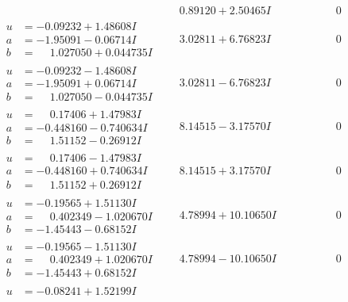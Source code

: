 \documentclass[1p]{elsarticle_modified}
\theoremstyle{definition}
\begin{document}
$$\begin{array}{c|c|c}
 & \phantom{-}0.89120 + 2.50465 I & \phantom{-0.000000 } 0 \\ \hline\begin{aligned}
u &= -0.09232 + 1.48608 I \\
a &= -1.95091 - 0.06714 I \\
b &= \phantom{-}1.027050 + 0.044735 I\end{aligned}
 & \phantom{-}3.02811 + 6.76823 I & \phantom{-0.000000 } 0 \\ \hline\begin{aligned}
u &= -0.09232 - 1.48608 I \\
a &= -1.95091 + 0.06714 I \\
b &= \phantom{-}1.027050 - 0.044735 I\end{aligned}
 & \phantom{-}3.02811 - 6.76823 I & \phantom{-0.000000 } 0 \\ \hline\begin{aligned}
u &= \phantom{-}0.17406 + 1.47983 I \\
a &= -0.448160 - 0.740634 I \\
b &= \phantom{-}1.51152 - 0.26912 I\end{aligned}
 & \phantom{-}8.14515 - 3.17570 I & \phantom{-0.000000 } 0 \\ \hline\begin{aligned}
u &= \phantom{-}0.17406 - 1.47983 I \\
a &= -0.448160 + 0.740634 I \\
b &= \phantom{-}1.51152 + 0.26912 I\end{aligned}
 & \phantom{-}8.14515 + 3.17570 I & \phantom{-0.000000 } 0 \\ \hline\begin{aligned}
u &= -0.19565 + 1.51130 I \\
a &= \phantom{-}0.402349 - 1.020670 I \\
b &= -1.45443 - 0.68152 I\end{aligned}
 & \phantom{-}4.78994 + 10.10650 I & \phantom{-0.000000 } 0 \\ \hline\begin{aligned}
u &= -0.19565 - 1.51130 I \\
a &= \phantom{-}0.402349 + 1.020670 I \\
b &= -1.45443 + 0.68152 I\end{aligned}
 & \phantom{-}4.78994 - 10.10650 I & \phantom{-0.000000 } 0 \\ \hline\begin{aligned}
u &= -0.08241 + 1.52199 I \\

\end{aligned}
\end{array}$$
\end{document}
